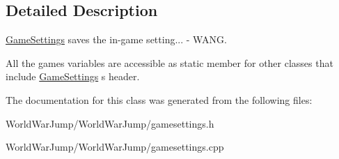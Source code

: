 \subsection{Detailed Description}
\hyperlink{class_game_settings}{Game\+Settings} saves the in-\/game setting... -\/ W\+A\+NG. 

All the game\textquotesingle{}s variables are accessible as static member for other classes that include \hyperlink{class_game_settings}{Game\+Settings} \textquotesingle{}s header. 

The documentation for this class was generated from the following files\+:\begin{DoxyCompactItemize}
\item 
World\+War\+Jump/\+World\+War\+Jump/gamesettings.\+h\item 
World\+War\+Jump/\+World\+War\+Jump/gamesettings.\+cpp\end{DoxyCompactItemize}

